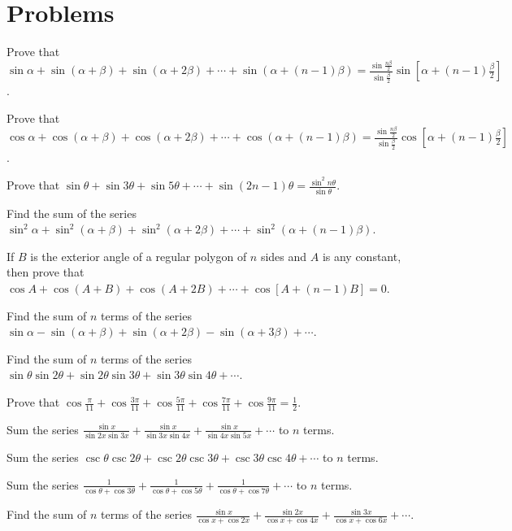 \section{Problems}
\startitemize[n, 1*broad]
\item Prove that $\sin\alpha + \sin(\alpha + \beta) + \sin(\alpha + 2\beta) + \cdots + \sin(\alpha + (n -
  1)\beta) = \frac{\sin\frac{n\beta}{2}}{\sin\frac{\beta}{2}}\sin\left[\alpha + (n -
    1)\frac{\beta}{2}\right]$.
\item Prove that $\cos\alpha + \cos(\alpha + \beta) + \cos(\alpha + 2\beta) + \cdots + \cos(\alpha + (n -
  1)\beta) = \frac{\sin\frac{n\beta}{2}}{\sin\frac{\beta}{2}}\cos\left[\alpha + (n -
    1)\frac{\beta}{2}\right]$.
\item Prove that $\sin\theta + \sin3\theta + \sin5\theta + \cdots + \sin(2n - 1)\theta =
  \frac{\sin^2n\theta}{\sin\theta}$.
\item Find the sum of the series $\sin^2\alpha + \sin^2(\alpha + \beta) + \sin^2(\alpha + 2\beta) + \cdots +
  \sin^2(\alpha + (n - 1)\beta)$.
\item If $B$ is the exterior angle of a regular polygon of $n$ sides and $A$ is any constant, then prove
  that $\cos A + \cos(A + B) + \cos(A + 2B) + \cdots + \cos[A + (n - 1)B] = 0$.
\item Find the sum of $n$ terms of the series $\sin\alpha - \sin(\alpha + \beta) + \sin(\alpha + 2\beta) -
  \sin(\alpha + 3\beta) + \cdots$.
\item Find the sum of $n$ terms of the series $\sin\theta\sin2\theta + \sin2\theta\sin3\theta +
  \sin3\theta\sin4\theta + \cdots$.
\item Prove that $\cos\frac{\pi}{11} + \cos\frac{3\pi}{11} + \cos\frac{5\pi}{11} + \cos\frac{7\pi}{11} +
  \cos\frac{9\pi}{11} = \frac{1}{2}$.
\item Sum the series $\frac{\sin x}{\sin2x\sin3x} + \frac{\sin x}{\sin3x\sin4x} + \frac{\sin
    x}{\sin4x\sin5x} + \cdots$ to $n$ terms.
\item Sum the series $\csc\theta\csc2\theta + \csc2\theta\csc3\theta + \csc3\theta\csc4\theta + \cdots$ to
  $n$ terms.
\item Sum the series $\frac{1}{\cos\theta + \cos3\theta} + \frac{1}{\cos\theta + \cos5\theta} +
  \frac{1}{\cos\theta + \cos7\theta} + \cdots$ to $n$ terms.
\item Find the sum of $n$ terms of the series $\frac{\sin x}{\cos x + \cos 2x} + \frac{\sin 2x}{\cos x +
    \cos4x} + \frac{\sin3x}{\cos x + \cos 6x} + \cdots$.
